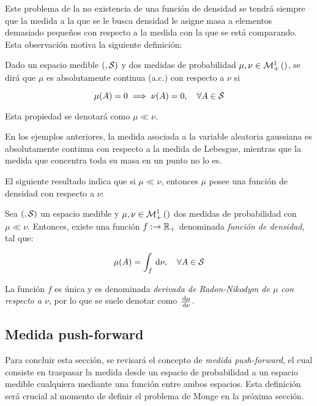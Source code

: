 Este problema de la no existencia de una función de densidad se tendrá siempre que la medida a la que se le busca densidad le asigne masa a elementos demasiado pequeños con respecto a la medida con la que se está comparando. Esta observación motiva la siguiente definición:

\begin{defn}
    \label{defn:absolute_continuity_measures}
    Dado un espacio medible $(,\mathcal{S})$ y dos medidas de probabilidad $\mu,\nu\in\mathcal{M}_+^1\left(\right)$, se dirá que $\mu$ es absolutamente continua (a.c.) con respecto a $\nu$ si

    \begin{equation*}
        \mu(A) = 0 \implies \nu(A)=0,\quad \forall A\in\mathcal{S}
    \end{equation*}

    Esta propiedad se denotará como $\mu\ll\nu$.
\end{defn}

En los ejemplos anteriores, la medida asociada a la variable aleatoria gaussiana es absolutamente continua con respecto a la medida de Lebesgue, mientras que la medida que concentra toda su masa en un punto no lo es.

El siguiente resultado indica que si $\mu\ll\nu$, entonces $\mu$ posee una función de densidad con respecto a $\nu$:

\begin{teo}
    \label{teo:radon_nikodym}
    Sea $(,\mathcal{S})$ un espacio medible y $\mu,\nu\in\mathcal{M}_+^1\left(\right)$ dos medidas de probabilidad con $\mu\ll\nu$. Entonces, existe una función $f:\to\mathbb{R}_+$ denominada \textit{función de densidad}, tal que:

    \begin{equation*}
        \mu(A) = \int_ f \,\operatorname{d}\!\nu, \quad\forall A\in\mathcal{S}
    \end{equation*}

    La función $f$ es única y es denominada \textit{derivada de Radon-Nikodym de $\mu$ con respecto a $\nu$}, por lo que se suele denotar como $\frac{\,\operatorname{d}\!\mu}{\,\operatorname{d}\!\nu}$.
\end{teo}

\subsection{Medida push-forward}
\label{measure_theory/others/push_forward}

Para concluir esta sección, se revisará el concepto de \textit{medida push-forward}, el cual consiste en traspasar la medida desde un espacio de probabilidad a un espacio medible cualquiera mediante una función entre ambos espacios. Esta definición será crucial al momento de definir el problema de Monge en la próxima sección.

